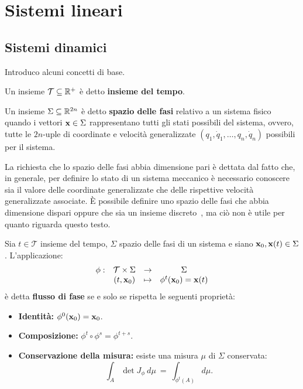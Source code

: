 \section{Sistemi lineari}
\subsection{Sistemi dinamici}
Introduco alcuni concetti di base.

\begin{definition}
    Un insieme $\mathcal T \subseteq \mathbb{R}^+$ è detto \textbf{insieme del tempo}.
\end{definition}

\begin{definition}
    Un insieme $\Sigma \subseteq \mathbb{R}^{2n}$ è detto \textbf{spazio delle fasi}
    relativo a un sistema fisico quando i vettori
    $\mathbf{x} \in \Sigma$ rappresentano tutti gli stati possibili
    del sistema, ovvero,
    tutte le $2n$-uple di coordinate e velocità generalizzate $(q_1, \dot q_1, \ldots, q_n, \dot q_n)$
    possibili per il sistema.
\end{definition}
La richiesta che lo spazio delle fasi abbia dimensione pari è dettata dal
fatto che, in generale, per definire lo stato di un sistema meccanico è
necessario conoscere sia il valore delle coordinate generalizzate
che delle rispettive velocità generalizzate associate.
È possibile definire uno spazio delle fasi che abbia dimensione dispari
oppure che sia un insieme discreto~\cite{Turchetti_1998}, ma ciò non è utile per quanto riguarda
questo testo.

\begin{definition}
\label{def:flusso-di-fase}
    Sia $t \in \mathcal T$ insieme del tempo, $\Sigma$ spazio delle fasi di un sistema e siano $\mathbf{x}_0, \mathbf{x}(t) \in \Sigma$.
    L'applicazione: \\
    \begin{equation*}
        \begin{array}{cccc}%
            \phi: &\mathcal T \times \Sigma &\to &\Sigma \\
            &(t, \b x_0) &\mapsto &\b \phi^t(\b x_0) = \b x(t)
        \end{array}%
    \end{equation*}
    è detta \textbf{flusso di fase} se e solo se rispetta le seguenti proprietà:
    \begin{itemize}
        \item \textbf{Identità:} $\phi^0(\mathbf{x}_0) = \mathbf{x}_0$.
        \item \textbf{Composizione:} $\phi^t \circ \phi^s = \phi^{t+s}$.
        \raggedright
        \item \textbf{Conservazione della misura:} esiste una misura $\mu$ di $\Sigma$ %
        conservata:
        \begin{equation*}
            \int_A \det J_\phi \ d\mu~=~\int_{\phi^t(A)} d\mu.
        \end{equation*}
    \end{itemize}
\end{definition}

